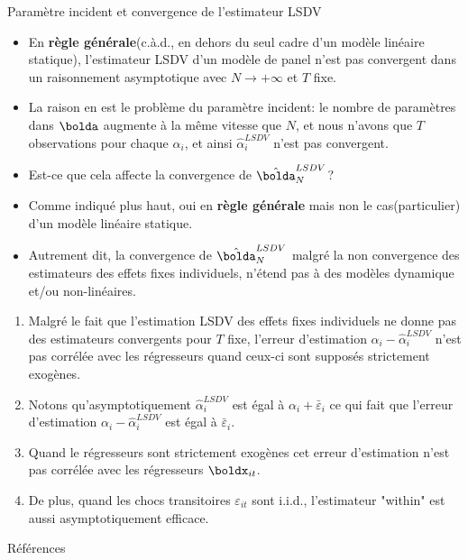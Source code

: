     \begin{frame}[allowframebreaks]{Paramètre incident et convergence de l'estimateur LSDV}
        \begin{itemize}
            \item En \textbf{règle générale}(c.à.d., en dehors du seul cadre d'un modèle linéaire statique), l'estimateur LSDV d'un modèle 
            de panel n'est pas convergent dans un raisonnement asymptotique avec $N\to + \infty$ et $T$ fixe.
            
            \item La raison en est le problème du paramètre incident: le nombre de paramètres dans $\bolda$ augmente à la même vitesse que 
            $N$, et nous n'avons que $T$ observations pour chaque $\alpha_i$, et ainsi $\hat{\alpha}^{LSDV}_i$ n'est pas convergent. 

            \item Est-ce que cela affecte la convergence de $\hat{\bolda}_N^{LSDV}$? 
            \item Comme indiqué plus haut, oui en \textbf{règle générale} mais non le cas(particulier) d'un modèle linéaire statique.
            \item Autrement dit, la convergence de $\hat{\bolda}_N^{LSDV}$ malgré la non convergence des estimateurs des effets fixes individuels, 
            n'étend pas à des modèles dynamique et/ou non-linéaires.
        \end{itemize}
        \framebreak

        \begin{remark_fr}
            \begin{enumerate}[$\star$]
                \item Malgré le fait que l'estimation LSDV des effets fixes individuels ne donne pas des estimateurs convergents 
                pour $T$ fixe, l'erreur d'estimation $\alpha_i - \hat{\alpha}_i^{LSDV}$ n'est pas corrélée avec les régresseurs 
                quand ceux-ci sont supposés strictement exogènes.  
                \item Notons qu'asymptotiquement $\hat{\alpha}_i^{LSDV}$ est égal à $\alpha_i + \bar{\varepsilon}_i$ ce qui 
                fait que l'erreur d'estimation $\alpha_i - \hat{\alpha}_i^{LSDV}$ est égal à $\bar{\varepsilon}_i$. 
                \item Quand le régresseurs sont strictement exogènes cet erreur d'estimation n'est 
                pas corrélée avec les régresseurs $\boldx_{it}$.
                \item De plus, quand les chocs transitoires $\varepsilon_{it}$ sont i.i.d., l'estimateur "within" 
                est aussi asymptotiquement efficace.
            \end{enumerate}
        \end{remark_fr}
    \end{frame}
\begin{frame}[allowframebreaks]{Références}
 
  
   \end{frame}

    
    